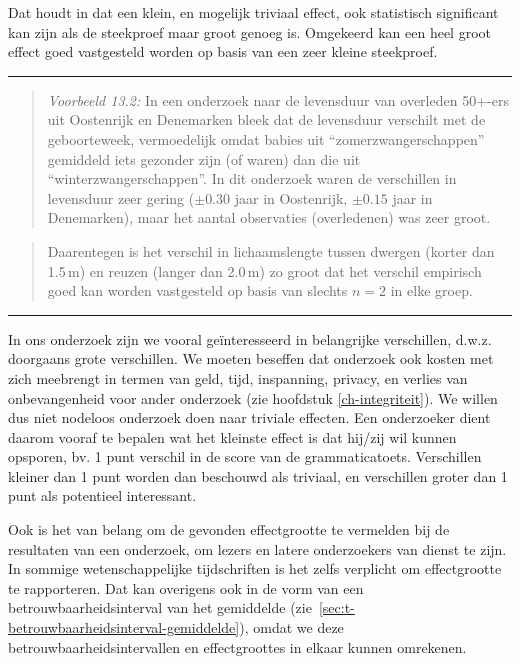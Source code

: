 \documentclass[
]{book}
\begin{document}
Dat houdt in dat een klein, en mogelijk triviaal effect, ook statistisch
significant kan zijn als de steekproef maar groot genoeg is. Omgekeerd
kan een heel groot effect goed vastgesteld worden op basis van een zeer
kleine steekproef.

\begin{center}\rule{0.5\linewidth}{0.5pt}\end{center}

\begin{quote}
\emph{Voorbeeld 13.2:} In een onderzoek naar de levensduur van overleden
50+-ers uit Oostenrijk en Denemarken \citep{Dobl99} bleek dat de levensduur
verschilt met de geboorteweek, vermoedelijk omdat babies uit
``zomerzwangerschappen'' gemiddeld iets gezonder zijn (of waren) dan die
uit ``winterzwangerschappen''. In dit onderzoek waren de verschillen in
levensduur zeer gering (\(\pm 0.30\) jaar in Oostenrijk, \(\pm 0.15\) jaar
in Denemarken), maar het aantal observaties (overledenen) was zeer
groot.
\end{quote}

\begin{quote}
Daarentegen is het verschil in lichaamslengte tussen dwergen (korter
dan 1.5 m) en reuzen (langer dan 2.0 m) zo groot dat het verschil
empirisch goed kan worden vastgesteld op basis van slechts \(n=2\) in
elke groep.
\end{quote}

\begin{center}\rule{0.5\linewidth}{0.5pt}\end{center}

In ons onderzoek zijn we vooral geïnteresseerd in belangrijke
verschillen, d.w.z. doorgaans grote verschillen. We moeten beseffen dat
onderzoek ook kosten met zich meebrengt in termen van geld, tijd,
inspanning, privacy, en verlies van onbevangenheid voor ander onderzoek
(zie hoofdstuk \ref{ch-integriteit}). We willen dus niet nodeloos
onderzoek doen naar triviale effecten. Een onderzoeker dient daarom
vooraf te bepalen wat het kleinste effect is dat hij/zij wil kunnen
opsporen, bv. 1 punt verschil in de score van de grammaticatoets.
Verschillen kleiner dan 1 punt worden dan beschouwd als triviaal, en
verschillen groter dan 1 punt als potentieel interessant.

Ook is het van belang om de gevonden effectgrootte te vermelden bij de
resultaten van een onderzoek, om lezers en latere onderzoekers van
dienst te zijn. In sommige wetenschappelijke tijdschriften is het zelfs
verplicht om effectgrootte te rapporteren. Dat kan overigens ook in de
vorm van een betrouwbaarheidsinterval van het gemiddelde
(zie~\ref{sec:t-betrouwbaarheidsinterval-gemiddelde}), omdat we deze
betrouwbaarheidsintervallen en effectgroottes in elkaar kunnen
omrekenen.
\end{document}
